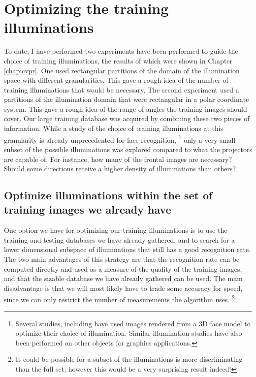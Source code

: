 \section{Optimizing the training illuminations} 
To date, I have performed two experiments have been performed to guide the
choice of training illuminations, the results of which were shown in Chapter
\ref{chap:cvpr}.  One used rectangular partitions of the domain of the
illumination space with different granularities.  This gave a rough idea of the
number of training illuminations that would be necessary.  The second
experiment used a partitions of the illumination domain that were rectangular
in a polar coordinate system.  This gave a rough idea of the range of angles
the training images should cover.  Our large training database was acquired by
combining these two pieces of information.  While a study of the choice of
training illuminations at this granularity is already unprecedented for face
recognition, \footnote{ Several studies, including \cite{Basri2003-PAMI,
LeeK2005-PAMI} have used images rendered from a 3D face model to optimize their
choice of illumination.  Similar illumination studies have also been performed
on other objects for graphics applications.} only a very small subset of the
possible illuminations was explored compared to what the projectors are capable
of.  For instance, how many of the frontal images are necessary?  Should some
directions receive a higher density of illuminations than others? 

\subsection{Optimize illuminations within the set of training images we already have}
One option we have for optimizing our training illuminations is to use the
training and testing databases we have already gathered, and to search for a
lower dimensional subspace of illuminations that still has a good recognition
rate.  The two main advantages of this strategy are that the recognition rate
can be computed directly and used as a measure of the quality of the training
images, and that the sizable database we have already gathered can be used.
The main disadvantage is that we will most likely have to trade some accuracy
for speed, since we can only restrict the number of measurements the algorithm
uses. \footnote{It could be possible for a subset of the illuminations is more
discriminating than the full set; however this would be a very surprising
result indeed!}


